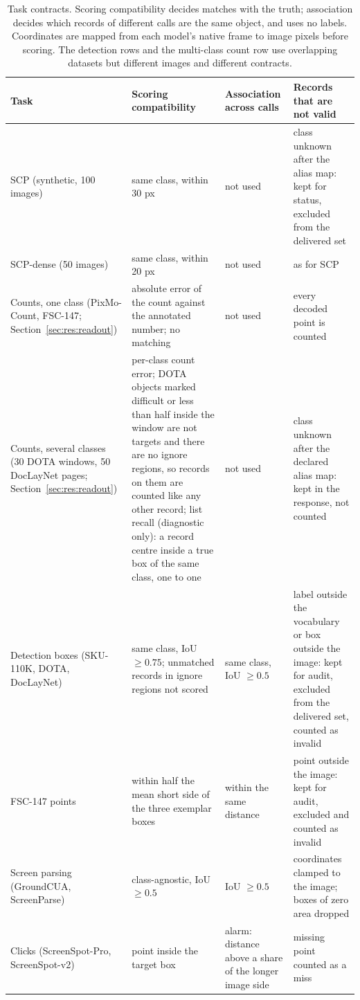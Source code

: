 \begin{table}[tp]
\centering\small\setlength{\tabcolsep}{4pt}
\caption{Task contracts. Scoring compatibility decides matches with the truth; association decides which records of different calls are the same object, and uses no labels. Coordinates are mapped from each model's native frame to image pixels before scoring. The detection rows and the multi-class count row use overlapping datasets but different images and different contracts.}\label{tab:contract}
\begin{tabular}{@{}>{\raggedright\arraybackslash}p{2.6cm}>{\raggedright\arraybackslash}p{3.9cm}>{\raggedright\arraybackslash}p{3.4cm}>{\raggedright\arraybackslash}p{5.0cm}@{}}\toprule
Task & Scoring compatibility & Association across calls & Records that are not valid \\\midrule
SCP (synthetic, 100 images) & same class, within 30 px & not used & class unknown after the alias map: kept for status, excluded from the delivered set \\
SCP-dense (50 images) & same class, within 20 px & not used & as for SCP \\
Counts, one class (PixMo-Count, FSC-147; Section~\ref{sec:res:readout}) & absolute error of the count against the annotated number; no matching & not used & every decoded point is counted \\
Counts, several classes (30 DOTA windows, 50 DocLayNet pages; Section~\ref{sec:res:readout}) & per-class count error; DOTA objects marked difficult or less than half inside the window are not targets and there are no ignore regions, so records on them are counted like any other record; list recall (diagnostic only): a record centre inside a true box of the same class, one to one & not used & class unknown after the declared alias map: kept in the response, not counted \\
Detection boxes (SKU-110K, DOTA, DocLayNet) & same class, IoU $\ge 0.75$; unmatched records in ignore regions not scored & same class, IoU $\ge 0.5$ & label outside the vocabulary or box outside the image: kept for audit, excluded from the delivered set, counted as invalid \\
FSC-147 points & within half the mean short side of the three exemplar boxes & within the same distance & point outside the image: kept for audit, excluded and counted as invalid \\
Screen parsing (GroundCUA, ScreenParse) & class-agnostic, IoU $\ge 0.5$ & IoU $\ge 0.5$ & coordinates clamped to the image; boxes of zero area dropped \\
Clicks (ScreenSpot-Pro, ScreenSpot-v2) & point inside the target box & alarm: distance above a share of the longer image side & missing point counted as a miss \\\bottomrule
\end{tabular}
\end{table}

